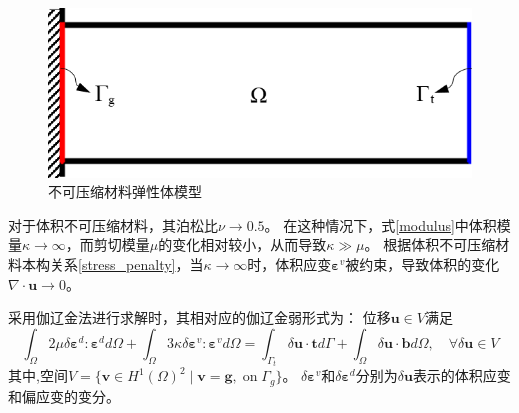 \begin{figure}[!h]
    \centering 
        \includegraphics[scale=0.7]{figures/model.png}
        \caption{不可压缩材料弹性体模型}\label{model}
\end{figure}

对于体积不可压缩材料，其泊松比$\nu \rightarrow 0.5$。 在这种情况下，式\eqref{modulus}中体积模量$\kappa \rightarrow \infty$，而剪切模量$\mu$的变化相对较小，从而导致$\kappa\gg\mu$。
根据体积不可压缩材料本构关系\eqref{stress_penalty}，当$\kappa \rightarrow \infty$时，体积应变$\boldsymbol \varepsilon^v$被约束，导致体积的变化$\nabla \cdot \boldsymbol u\rightarrow 0$。

采用伽辽金法进行求解时，其相对应的伽辽金弱形式为：
位移$\boldsymbol u \in V$满足
\begin{equation}\label{weak_penalty}
\int_\Omega 2\mu \delta \boldsymbol \varepsilon^d : \boldsymbol \varepsilon^d d\Omega +
\int_\Omega 3\kappa \delta \boldsymbol \varepsilon^v : \boldsymbol \varepsilon^v d\Omega =
\int_{\Gamma_t} \delta \boldsymbol u \cdot \boldsymbol t d\Gamma + \int_\Omega \delta \boldsymbol u \cdot \boldsymbol b d\Omega, \quad
\forall \delta \boldsymbol u \in V
\end{equation}
其中,空间$V=\{\boldsymbol v \in H^1(\Omega)^2\;\vert\;\boldsymbol v = \boldsymbol g, \; \textrm{on} \; \Gamma_g\}$。
$\delta\boldsymbol \varepsilon^v$和$\delta\boldsymbol \varepsilon^d $分别为$\delta \boldsymbol u$表示的体积应变和偏应变的变分。


